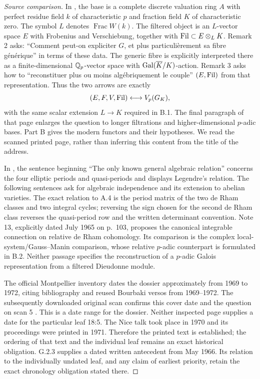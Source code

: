 \begin{proof}[Source comparison]
In \cite[p.~435, Remarks 2--3]{Grothendieck1970BT}, the base is a complete discrete valuation ring $A$ with perfect residue field $k$ of characteristic $p$ and fraction field $K$ of characteristic zero. The symbol $L$ denotes $\operatorname{Frac}W(k)$. The filtered object is an $L$-vector space $E$ with Frobenius and Verschiebung, together with $\mathrm{Fil}\subset E\otimes_LK$. Remark 2 asks: ``Comment peut-on expliciter $G$, et plus particulièrement sa fibre générique'' in terms of these data. The generic fibre is explicitly interpreted there as a finite-dimensional $\mathbb Q_p$-vector space with $\operatorname{Gal}(\overline K/K)$-action. Remark 3 asks how to ``reconstituer plus ou moins algébriquement le couple'' $(E,\mathrm{Fil})$ from that representation. Thus the two arrows are exactly
\[
 (E,F,V,\mathrm{Fil})\longleftrightarrow V_p(G_K),
\]
with the same scalar extension $L\to K$ required in B.1. The final paragraph of that page enlarges the question to longer filtrations and higher-dimensional $p$-adic bases. Part B gives the modern functors and their hypotheses. We read the scanned printed page, rather than inferring this content from the title of the address.

In \cite[note 10, p.~102]{Grothendieck1966}, the sentence beginning ``The only known general algebraic relation'' concerns the four elliptic periods and quasi-periods and displays Legendre's relation. The following sentences ask for algebraic independence and its extension to abelian varieties. The exact relation to A.4 is the period matrix of the two de Rham classes and two integral cycles; reversing the sign chosen for the second de Rham class reverses the quasi-period row and the written determinant convention. Note 13, explicitly dated July 1965 on p.~103, proposes the canonical integrable connection on relative de Rham cohomology. Its comparison is the complex local-system/Gauss--Manin comparison, whose relative $p$-adic counterpart is formulated in B.2. Neither passage specifies the reconstruction of a $p$-adic Galois representation from a filtered Dieudonne module.

The official Montpellier inventory \cite[cote 18 and note 16]{MontpellierInventory} dates the dossier approximately from 1969 to 1972, citing bibliography and reused Bourbaki versos from 1969--1972. The subsequently downloaded original scan confirms this cover date and the question on scan 5 \cite[cover and scan 5]{GrothendieckCote18Scan}. This is a date range for the dossier. Neither inspected page supplies a date for the particular leaf 18:5. The Nice talk took place in 1970 and its proceedings were printed in 1971. Therefore the printed text is established; the ordering of that text and the individual leaf remains an exact historical obligation. G.2.3 supplies a dated written antecedent from May 1966. Its relation to the individually undated leaf, and any claim of earliest priority, retain the exact chronology obligation stated there.
\end{proof}


